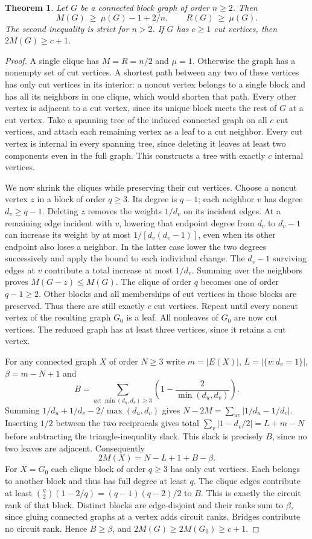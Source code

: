 \documentclass[11pt,a4paper]{article}
\newtheorem{theorem}{Theorem}[section]
\begin{document}
\begin{theorem}\label{p07-thm:strongblocks}
Let $G$ be a connected block graph of order $n\ge2$. Then
\[
 M(G)\ \ge\ \mu(G)-1+2/n,\qquad R(G)\ \ge\ \mu(G).
\]
The second inequality is strict for $n>2$. If $G$ has $c\ge1$ cut
vertices, then $2M(G)\ge c+1$.
\end{theorem}
\begin{proof}
A single clique has $M=R=n/2$ and $\mu=1$. Otherwise the graph has a
nonempty set of cut vertices. A shortest path between any two of these
vertices has only cut vertices in its interior: a noncut vertex belongs
to a single block and has all its neighbors in one clique, which would
shorten that path. Every other vertex is adjacent to a cut vertex,
since its unique block meets the rest of $G$ at a cut vertex. Take a
spanning tree of the induced connected graph on all $c$ cut vertices,
and attach each remaining vertex as a leaf to a cut neighbor. Every
cut vertex is internal in every spanning tree, since deleting it leaves
at least two components even in the full graph. This constructs a tree
with exactly $c$ internal vertices.

We now shrink the cliques while preserving their cut vertices. Choose a
noncut vertex $z$ in a block of order $q\ge3$. Its degree is $q-1$;
each neighbor $v$ has degree $d_v\ge q-1$. Deleting $z$ removes the
weights $1/d_v$ on its incident edges. At a remaining edge incident
with $v$, lowering that endpoint degree from $d_v$ to $d_v-1$ can
increase its weight by at most $1/[d_v(d_v-1)]$, even when its other
endpoint also loses a neighbor. In the latter case lower the two
degrees successively and apply the bound to each individual change.
The $d_v-1$ surviving edges at $v$ contribute a total increase at most
$1/d_v$. Summing over the neighbors proves $M(G-z)\le M(G)$.
The clique of order $q$ becomes one of order $q-1\ge2$. Other blocks
and all memberships of cut vertices in those blocks are preserved.
Thus there are still exactly $c$ cut vertices. Repeat until every
noncut vertex of the resulting graph $G_0$ is a leaf. All nonleaves of
$G_0$ are now cut vertices. The reduced graph has at least three vertices,
since it retains a cut vertex.

For any connected graph $X$ of order $N\ge3$ write $m=|E(X)|$,
$L=|\{v:d_v=1\}|$, $\beta=m-N+1$ and
\[
 B=\sum_{uv:\,\min(d_u,d_v)\ge3}\left(1-\frac2{\min(d_u,d_v)}\right).
\]
Summing $1/d_u+1/d_v-2/\max(d_u,d_v)$ gives
$N-2M=\sum_{uv}|1/d_u-1/d_v|$. Inserting $1/2$ between the two
reciprocals gives total $\sum_v|1-d_v/2|=L+m-N$ before subtracting
the triangle-inequality slack. This slack is precisely $B$, since no
two leaves are adjacent. Consequently
\[
 2M(X)=N-L+1+B-\beta .
\]
For $X=G_0$ each clique block of order $q\ge3$ has only cut vertices.
Each belongs to another block and thus has full degree at least $q$.
The clique edges contribute at least
$\binom q2(1-2/q)=(q-1)(q-2)/2$ to $B$. This is exactly the circuit
rank of that block. Distinct blocks are edge-disjoint and their ranks
sum to $\beta$, since gluing connected graphs at a vertex adds
circuit ranks. Bridges contribute no circuit rank. Hence $B\ge\beta$,
and $2M(G)\ge2M(G_0)\ge c+1$.


\end{proof}
\end{document}
